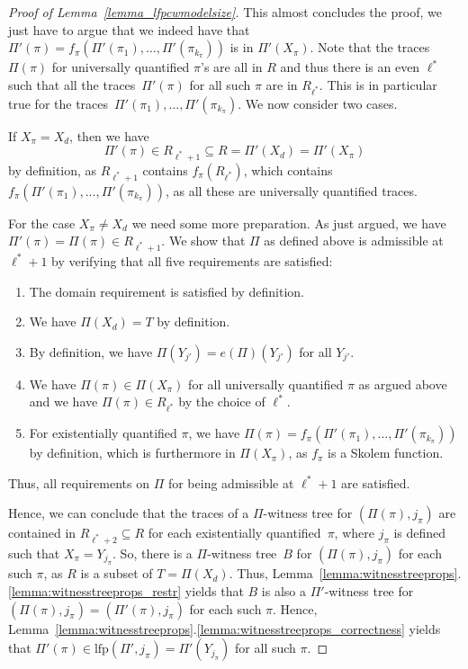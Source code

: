 \documentclass[dvipsnames,10pt,a4paper]{amsart}
\theoremstyle{definition}
\theoremstyle{remark}
\newcommand{\unidisvar}{X_d}
\newcommand{\lfp}{\mathrm{lfp}}
\newcommand{\itereval}{e}
\begin{document}
\begin{proof}[Proof of Lemma~\ref{lemma_lfpcwmodelsize}]
This almost concludes the proof, we just have to argue that we indeed have that $\Pi'(\pi)= f_{\pi}(\Pi'(\pi_1), \ldots, \Pi'(\pi_{k_\pi}))$ is in $\Pi'(X_\pi) $.
Note that the traces~$\Pi(\pi)$ for universally quantified $\pi$'s are all in $R$ and thus there is an even $\ell^*$ such that all the traces~$\Pi'(\pi)$ for all such $\pi$ are in $R_{\ell^*}$. 
This is in particular true for the traces~$\Pi'(\pi_1), \ldots, \Pi'(\pi_{k_\pi})$. 
We now consider two cases.

If $X_\pi = \unidisvar$, then we have \[\Pi'(\pi) \in R_{\ell^*+1} \subseteq R = \Pi'(\unidisvar) = \Pi'(X_\pi)\] by definition, as $R_{\ell^*+1}$ contains $f_\pi(R_{\ell^*})$, which contains $f_{\pi}(\Pi'(\pi_1), \ldots, \Pi'(\pi_{k_\pi}))$, as all these are universally quantified traces.

For the case $X_\pi \neq \unidisvar$ we need some more preparation.
As just argued, we have $\Pi'(\pi) = \Pi(\pi) \in R_{\ell^*+1}$.
We show that $\Pi$ as defined above is admissible at $\ell^*+1$ by verifying that all five requirements are satisfied:
\begin{enumerate}
    \item The domain requirement is satisfied by definition.
    \item We have $\Pi(\unidisvar) = T$ by definition.
    \item By definition, we have $\Pi(Y_{j'}) = \itereval(\Pi)(Y_{j'})$ for all $Y_{j'}$.
    \item We have $\Pi(\pi) \in \Pi(X_\pi)$ for all universally quantified $\pi$ as argued above and we have $\Pi(\pi) \in R_{\ell^*}$ by the choice of $\ell^*$.
    \item For existentially quantified $\pi$, we have $\Pi(\pi) = f_\pi(\Pi'(\pi_1), \ldots, \Pi'(\pi_{k_\pi}))$ by definition, which is furthermore in $\Pi(X_\pi)$, as $f_\pi$ is a Skolem function.
\end{enumerate}
Thus, all requirements on $\Pi$ for being admissible at $\ell^*+1$ are satisfied.

Hence, we can conclude that the traces of a $\Pi$-witness tree for $(\Pi(\pi),j_\pi)$ are contained in $R_{\ell^*+2} \subseteq R$ for each existentially quantified~$\pi$, where $j_\pi$ is defined such that $X_\pi = Y_{j_\pi}$.
So, there is a $\Pi$-witness tree~$B$ for $(\Pi(\pi),j_\pi)$ for each such $\pi$, as $R$ is a subset of $T = \Pi(\unidisvar)$.
Thus, Lemma~\ref{lemma:witnesstreeprops}.\ref{lemma:witnesstreeprops_restr} yields that $B$ is also a $\Pi'$-witness tree for $(\Pi(\pi),j_\pi) = (\Pi'(\pi),j_\pi)$ for each such $\pi$.
Hence, Lemma~\ref{lemma:witnesstreeprops}.\ref{lemma:witnesstreeprops_correctness} yields that $\Pi'(\pi) \in \lfp(\Pi',j_\pi) = \Pi'(Y_{j_\pi})$ for all such $\pi$. 
\end{proof}
\end{document}
